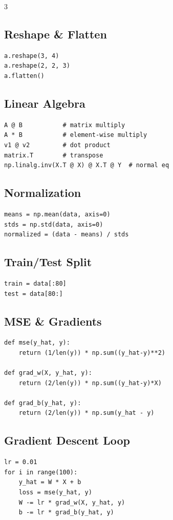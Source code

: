 \documentclass[6pt,landscape,a4paper]{extarticle}
\begin{document}
\begin{multicols}{3}
\subsection{Reshape \& Flatten}
\begin{lstlisting}
a.reshape(3, 4)
a.reshape(2, 2, 3)
a.flatten()
\end{lstlisting}

\subsection{Linear Algebra}
\begin{lstlisting}
A @ B           # matrix multiply
A * B           # element-wise multiply
v1 @ v2         # dot product
matrix.T        # transpose
np.linalg.inv(X.T @ X) @ X.T @ Y  # normal eq
\end{lstlisting}

\subsection{Normalization}
\begin{lstlisting}
means = np.mean(data, axis=0)
stds = np.std(data, axis=0)
normalized = (data - means) / stds
\end{lstlisting}

\subsection{Train/Test Split}
\begin{lstlisting}
train = data[:80]
test = data[80:]
\end{lstlisting}

\subsection{MSE \& Gradients}
\begin{lstlisting}
def mse(y_hat, y):
    return (1/len(y)) * np.sum((y_hat-y)**2)

def grad_w(X, y_hat, y):
    return (2/len(y)) * np.sum((y_hat-y)*X)

def grad_b(y_hat, y):
    return (2/len(y)) * np.sum(y_hat - y)
\end{lstlisting}

\subsection{Gradient Descent Loop}
\begin{lstlisting}
lr = 0.01
for i in range(100):
    y_hat = W * X + b
    loss = mse(y_hat, y)
    W -= lr * grad_w(X, y_hat, y)
    b -= lr * grad_b(y_hat, y)
\end{lstlisting}


\end{multicols}
\end{document}
